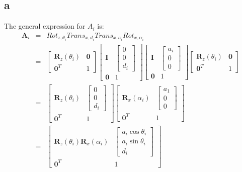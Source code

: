 \documentclass[11pt]{article}
\begin{document}
\subsection*{a}
The general expression for $A_i$ is:
\begin{eqnarray*}
\mathbf{A}_i &=& Rot_{z,\theta_i} Trans_{x,d_i} Trans_{x,a_i} Rot_{x,\alpha_i} \\
&=& 
\begin{bmatrix} 
\mathbf{R}_z(\theta_i) & \mathbf{0} \\
\mathbf{0}^T & 1
\end{bmatrix}
\begin{bmatrix}
\mathbf{I} & \begin{bmatrix}0 \\ 0 \\ d_i \end{bmatrix} \\
\mathbf{0} & 1
\end{bmatrix}
\begin{bmatrix}
\mathbf{I} & \begin{bmatrix} a_i \\ 0 \\ 0 \end{bmatrix} \\
\mathbf{0} & 1
\end{bmatrix}
\begin{bmatrix} 
\mathbf{R}_z(\theta_i) & \mathbf{0} \\
\mathbf{0}^T & 1
\end{bmatrix} \\
&=&
\begin{bmatrix} 
\mathbf{R}_z(\theta_i) & \begin{bmatrix}0 \\ 0 \\ d_i \end{bmatrix} \\
\mathbf{0}^T & 1
\end{bmatrix}
\begin{bmatrix} 
\mathbf{R}_x(\alpha_i) & \begin{bmatrix} a_1 \\ 0 \\ 0 \end{bmatrix} \\
\mathbf{0}^T & 1
\end{bmatrix} \\
&=&
\begin{bmatrix} 
\mathbf{R}_z(\theta_i)\mathbf{R}_x(\alpha_i) & \begin{bmatrix}a_i \cos{\theta_i} \\ a_i \sin{\theta_i} \\ d_i \end{bmatrix} \\
\mathbf{0}^T & 1
\end{bmatrix}
\end{eqnarray*}
\end{document}
